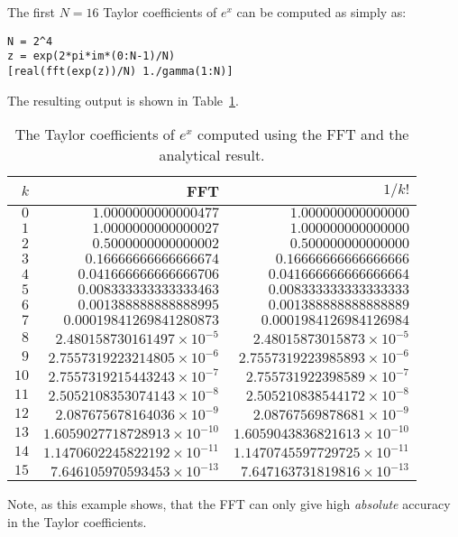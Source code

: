 \begin{example}
The first $N=16$ Taylor coefficients of $e^x$ can be computed as simply as:
\begin{verbatim}
N = 2^4
z = exp(2*pi*im*(0:N-1)/N)
[real(fft(exp(z))/N) 1./gamma(1:N)]
\end{verbatim}
The resulting output is shown in Table~\ref{table:TaylorExponential}.
\begin{table}[htdp]
\caption{The Taylor coefficients of $e^x$ computed using the FFT and the analytical result.}
\begin{center}
\begin{tabular}{rrr}
\hline
$k$ & FFT & $1/k!$\\
\hline
$0$ & $1.0000000000000477$ & $1.000000000000000$\\
$1$ & $1.0000000000000027$ & $1.000000000000000$\\
$2$ & $0.5000000000000002$ & $0.500000000000000$\\
$3$ & $0.16666666666666674$ & $0.16666666666666666$\\
$4$ & $0.041666666666666706$ & $0.041666666666666664$\\
$5$ & $0.008333333333333463$ & $0.008333333333333333$\\
$6$ & $0.001388888888888995$ & $0.001388888888888889$\\
$7$ & $0.00019841269841280873$ & $0.0001984126984126984$\\
$8$ & $2.480158730161497\times10^{-5}$ & $2.48015873015873\times10^{-5}$\\
$9$ & $2.7557319223214805\times10^{-6}$ & $2.7557319223985893\times10^{-6}$\\
$10$ & $2.7557319215443243\times10^{-7}$ & $2.755731922398589\times10^{-7}$\\
$11$ & $2.5052108353074143\times10^{-8}$ & $2.505210838544172\times10^{-8}$\\
$12$ & $2.087675678164036\times10^{-9}$ & $2.08767569878681\times10^{-9}$\\
$13$ & $1.6059027718728913\times10^{-10}$ & $1.6059043836821613\times10^{-10}$\\
$14$ & $1.1470602245822192\times10^{-11}$ & $1.1470745597729725\times10^{-11}$\\
$15$ & $7.646105970593453\times10^{-13}$ & $7.647163731819816\times10^{-13}$\\
\hline
\end{tabular}
\end{center}
\label{table:TaylorExponential}
\end{table}%
Note, as this example shows, that the FFT can only give high {\em absolute} accuracy in the Taylor coefficients.
\end{example}

